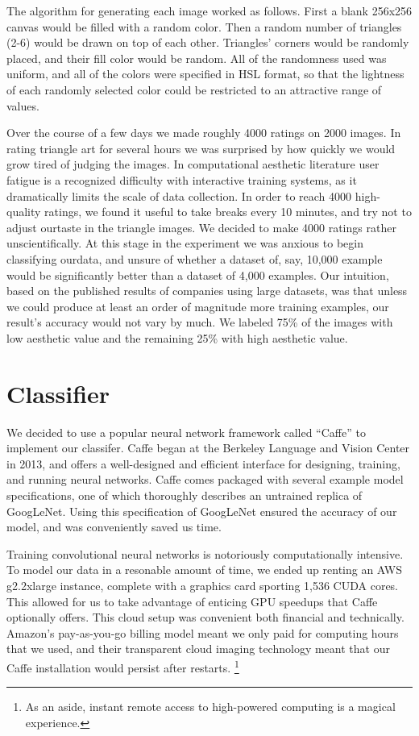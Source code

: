 \documentclass[midd]{thesis}
\begin{document}
The algorithm for generating each image worked as follows. First a blank 256x256 canvas would be filled with a random color. Then a random number of triangles (2-6) would be drawn on top of each other. Triangles' corners would be randomly placed, and their fill color would be random. All of the randomness used was uniform, and all of the colors were specified in HSL format, so that the lightness of each randomly selected color could be restricted to an attractive range of values.

Over the course of a few days we made roughly 4000 ratings on  2000 images. In rating triangle art for several hours we was surprised by how quickly we would grow tired of judging the images. In computational aesthetic literature user fatigue is a recognized difficulty with interactive training systems, as it dramatically limits the scale of data collection. In order to reach 4000 high-quality ratings, we found it useful to take breaks every 10 minutes, and try not to adjust ourtaste in the triangle images. We decided to make 4000 ratings rather unscientifically. At this stage in the experiment we was anxious to begin classifying ourdata, and unsure of whether a dataset of, say, 10,000 example would be significantly better than a dataset of 4,000 examples. Our intuition, based on the published results of companies using large datasets, was that unless we could produce at least an order of magnitude more training examples, our result's accuracy would not vary by much. We labeled 75\% of the images with low aesthetic value and the remaining 25\% with high aesthetic value.


\section{Classifier}

We decided to use a popular neural network framework called ``Caffe'' to implement our classifer. Caffe began at the Berkeley Language and Vision Center in 2013, and offers a well-designed and efficient interface for designing, training, and running neural networks. Caffe comes packaged with several example model specifications, one of which thoroughly describes an untrained replica of GoogLeNet. Using this specification of GoogLeNet ensured the accuracy of our model, and was conveniently saved us time.

Training convolutional neural networks is notoriously computationally intensive. To model our data in a resonable amount of time, we ended up renting an AWS g2.2xlarge instance, complete with a graphics card sporting 1,536 CUDA cores. This allowed for us to take advantage of enticing GPU speedups that Caffe optionally offers.
This cloud setup was convenient both financial and technically. Amazon's pay-as-you-go billing model meant we only paid for computing hours that we used, and their transparent cloud imaging technology meant that our Caffe installation would persist after restarts.
\footnote{As an aside, instant remote access to high-powered computing is a magical experience.}
\end{document}
